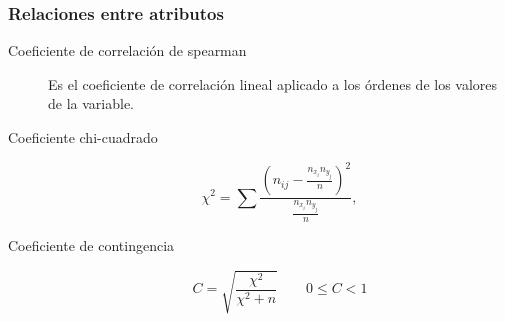 \documentclass[a4paper,dvips]{article}
\newlength{\mylength}
\newenvironment{marco}{
	\setlength{\fboxsep}{5pt}
	\setlength{\mylength}{\textwidth}
	\addtolength{\mylength}{-2\fboxsep}
	\addtolength{\mylength}{-2\fboxrule}
	\noindent
	\begin{Sbox}
	\begin{minipage}{\mylength}
	\setlength{\abovedisplayskip}{3pt}
	\setlength{\belowdisplayskip}{3pt}
}
{
	\end{minipage}
	\end{Sbox}
	\fbox{\TheSbox}
}
\begin{document}
\begin{marco}
\begin{multicols}{2}
\subsubsection*{Relaciones entre atributos}
\begin{description}
\item[Coeficiente de correlación de spearman] Es el coeficiente de correlación lineal aplicado a los órdenes de los valores de la
variable.
\item[Coeficiente chi-cuadrado]
\[
\chi^2 = \sum \frac{\left(n_{ij}-\frac{n_{x_i}n_{y_j}}{n}\right)^2}{\frac{n_{x_i}n_{y_j}}{n}},
\]
\item[Coeficiente de contingencia]
\[
C = \sqrt{\frac{\chi^2}{\chi^2+n}} \qquad 0\leq C <1
\]
\end{description}
\end{multicols}
\end{marco}
\end{document}
